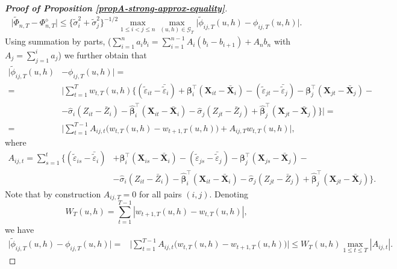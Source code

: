 \documentclass[a4paper,12pt]{article}
\begin{document}
\begin{proof}[\textnormal{\textbf{Proof of Proposition \ref{propA-strong-approx-equality}}}]
\begin{align}\label{eq-strongapprox-bound2}
\big| \widetilde{\Phi}_{n, T} - \Phi_{n, T}^{\diamond} \big| \le \{\widetilde{\sigma}_i^2 + \widetilde{\sigma}_j^2 \}^{-1/2} \max_{1\le i < j \le n} \max_{(u,h) \in \mathcal{G}_T} \big| \widetilde{\phi}_{ij, T}(u,h) - \phi_{ij, T}(u,h) \big|.
\end{align}
Using summation by parts,
($\sum_{i=1}^n a_i b_i = \sum_{i=1}^{n-1} A_i (b_i - b_{i+1}) + A_n b_n$ with $A_j = \sum_{j=1}^i a_j$) 
we further obtain that 
\begin{align*}
\big| \widetilde{\phi}_{ij, T}(u,h) &- \phi_{ij, T}(u,h) \big| = \\
=&\bigg|\sum_{t=1}^T w_{t,T}(u,h) \big\{ (\widetilde{\varepsilon}_{it} - \bar{\widetilde{\varepsilon}}_i) + \bm{\beta}_i^\top (\mathbf{X}_{it} - \bar{\mathbf{X}}_{i}) - (\widetilde{\varepsilon}_{jt} - \bar{\widetilde{\varepsilon}}_j) -\bm{\beta}_j^\top (\mathbf{X}_{jt} - \bar{\mathbf{X}}_{j}) -\\
&-\widehat{\sigma}_i (Z_{it} - \bar{Z}_i) - \widehat{\bm{\beta}}_i^\top (\mathbf{X}_{it} - \bar{\mathbf{X}}_{i}) - \widehat{\sigma}_j (Z_{jt} - \bar{Z}_j) + \widehat{\bm{\beta}}_j^\top (\mathbf{X}_{jt} - \bar{\mathbf{X}}_{j}) \big\}\bigg| = \\
=&\Big|\sum_{t=1}^{T-1} A_{ij, t} \big(w_{t,T}(u,h) -w_{t+1,T}(u,h)\big) + A_{ij, T} w_{t,T}(u,h)\Big|,
\end{align*}
where 
\begin{align*}
A_{ij, t} = \sum_{s=1}^t \big\{ (\widetilde{\varepsilon}_{is} - \bar{\widetilde{\varepsilon}}_i) &+ \bm{\beta}_i^\top (\mathbf{X}_{is} - \bar{\mathbf{X}}_{i}) - (\widetilde{\varepsilon}_{js} - \bar{\widetilde{\varepsilon}}_j) -\bm{\beta}_j^\top (\mathbf{X}_{js} - \bar{\mathbf{X}}_{j}) - \\
&-\widehat{\sigma}_i (Z_{it} - \bar{Z}_i) - \widehat{\bm{\beta}}_i^\top (\mathbf{X}_{it} - \bar{\mathbf{X}}_{i}) - \widehat{\sigma}_j (Z_{jt} - \bar{Z}_j) + \widehat{\bm{\beta}}_j^\top (\mathbf{X}_{jt} - \bar{\mathbf{X}}_{j}) \big\}.
\end{align*}
Note that by construction $A_{ij, T} = 0$ for all pairs $(i, j)$. Denoting 
\[ W_T(u,h) = \sum\limits_{t=1}^{T-1} |w_{t+1,T}(u,h) - w_{t,T}(u,h)|,\]
we have 
\begin{align}\label{eq-strongapprox-bound3}
\big| \widetilde{\phi}_{ij, T}(u,h) - \phi_{ij, T}(u,h) \big| =& \Big|\sum_{t=1}^{T-1} A_{ij, t} \big(w_{t,T}(u,h) -w_{t+1,T}(u,h)\big)\Big|\le W_T(u, h)\max_{1 \le t \le T} |A_{ij, t}|.
\end{align}

\end{proof}
\end{document}
